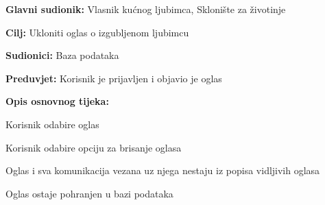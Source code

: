 					\pagebreak
					\noindent {}
					\begin{packed_item}
						
						\item \textbf{Glavni sudionik: }Vlasnik kućnog ljubimca, Sklonište za životinje
						\item  \textbf{Cilj:} Ukloniti oglas o izgubljenom ljubimcu
						\item  \textbf{Sudionici:} Baza podataka
						\item  \textbf{Preduvjet:} Korisnik je prijavljen i objavio je oglas
						\item  \textbf{Opis osnovnog tijeka:}
						
						\item[] \begin{packed_enum}
							
							\item Korisnik odabire oglas
							\item Korisnik odabire opciju za brisanje oglasa
							\item Oglas i sva komunikacija vezana uz njega nestaju iz popisa vidljivih oglasa
							\item Oglas ostaje pohranjen u bazi podataka
						\end{packed_enum}
						
					\end{packed_item}
					
